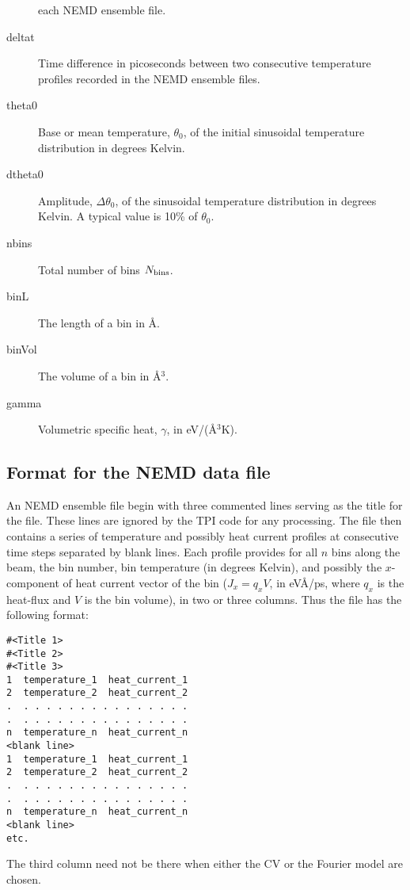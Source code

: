 \documentclass[11pt]{article}
\newcommand{\nbins}{N_{\rm bins}}
\newcommand{\tpicode}{TPI code\xspace}
\numberwithin{equation}{section}
\begin{document}
\begin{description}
  each NEMD ensemble file.
\item[deltat] Time difference in picoseconds between two consecutive
  temperature profiles recorded in the NEMD ensemble files.
\item[theta0] Base or mean temperature, $\theta_0$, of the initial sinusoidal
  temperature distribution in degrees Kelvin. 
\item[dtheta0] Amplitude, $\Delta\theta_0$, of the sinusoidal temperature
  distribution in degrees Kelvin. A typical value is 10\% of $\theta_0$.
\item[nbins] Total number of bins $\nbins$. 
\item[binL] The length of a bin in \AA.  
\item[binVol] The volume of a bin in \AA$^3$.  
\item[gamma] Volumetric specific heat, $\gamma$, in eV/(\AA$^3$K). 
\end{description}

\subsection{Format for the NEMD data file}\label{sec:format}
An NEMD ensemble file begin with three commented lines serving as the title for
the file. These lines are ignored by the \tpicode for any processing. The file
then contains a series of temperature and possibly heat current profiles
at consecutive time steps separated by blank lines. Each profile provides for all $n$ 
bins along the beam, the bin number, bin temperature (in degrees Kelvin), and possibly
the $x$-component of heat current vector of the bin ($J_x = q_x V$, in eV\AA/ps, where
$q_x$ is the heat-flux and $V$ is the bin volume), in two or three columns.
Thus the file has the following format:
\begin{verbatim}
#<Title 1>
#<Title 2>
#<Title 3>
1  temperature_1  heat_current_1
2  temperature_2  heat_current_2
.  . . . . . . . . . . . . . . .  
.  . . . . . . . . . . . . . . .  
n  temperature_n  heat_current_n
<blank line>
1  temperature_1  heat_current_1
2  temperature_2  heat_current_2
.  . . . . . . . . . . . . . . .  
.  . . . . . . . . . . . . . . .  
n  temperature_n  heat_current_n
<blank line>
etc.
\end{verbatim}
The third column need not be there when either the CV or the Fourier model are
chosen.
\end{document}
